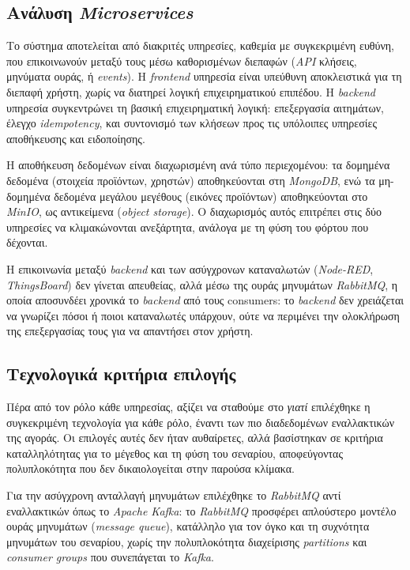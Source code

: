\newpage
\subsection{Ανάλυση \textit{Microservices}}

Το σύστημα αποτελείται από διακριτές υπηρεσίες, καθεμία με συγκεκριμένη ευθύνη, που επικοινωνούν μεταξύ τους μέσω καθορισμένων διεπαφών (\textit{API} κλήσεις, μηνύματα ουράς, ή \textit{events}). Η \textit{frontend} υπηρεσία είναι υπεύθυνη αποκλειστικά για τη διεπαφή χρήστη, χωρίς να διατηρεί λογική επιχειρηματικού επιπέδου. Η \textit{backend} υπηρεσία συγκεντρώνει τη βασική επιχειρηματική λογική: επεξεργασία αιτημάτων, έλεγχο \textit{idempotency}, και συντονισμό των κλήσεων προς τις υπόλοιπες υπηρεσίες αποθήκευσης και ειδοποίησης.

Η αποθήκευση δεδομένων είναι διαχωρισμένη ανά τύπο περιεχομένου: τα δομημένα δεδομένα (στοιχεία προϊόντων, χρηστών) αποθηκεύονται στη \textit{MongoDB}, ενώ τα μη-δομημένα δεδομένα μεγάλου μεγέθους (εικόνες προϊόντων) αποθηκεύονται στο \textit{MinIO}, ως αντικείμενα (\textit{object storage}). Ο διαχωρισμός αυτός επιτρέπει στις δύο υπηρεσίες να κλιμακώνονται ανεξάρτητα, ανάλογα με τη φύση του φόρτου που δέχονται.

Η επικοινωνία μεταξύ \textit{backend} και των ασύγχρονων καταναλωτών (\textit{Node-RED}, \textit{ThingsBoard}) δεν γίνεται απευθείας, αλλά μέσω της ουράς μηνυμάτων \textit{RabbitMQ}, η οποία αποσυνδέει χρονικά το \textit{backend} από τους consumers: το \textit{backend} δεν χρειάζεται να γνωρίζει πόσοι ή ποιοι καταναλωτές υπάρχουν, ούτε να περιμένει την ολοκλήρωση της επεξεργασίας τους για να απαντήσει στον χρήστη.


\subsection{Τεχνολογικά κριτήρια επιλογής}

Πέρα από τον ρόλο κάθε υπηρεσίας, αξίζει να σταθούμε στο \textit{γιατί} επιλέχθηκε η συγκεκριμένη τεχνολογία για κάθε ρόλο, έναντι των πιο διαδεδομένων εναλλακτικών της αγοράς. Οι επιλογές αυτές δεν ήταν αυθαίρετες, αλλά βασίστηκαν σε κριτήρια καταλληλότητας για το μέγεθος και τη φύση του σεναρίου, αποφεύγοντας πολυπλοκότητα που δεν δικαιολογείται στην παρούσα κλίμακα.

Για την ασύγχρονη ανταλλαγή μηνυμάτων επιλέχθηκε το \textit{RabbitMQ} αντί εναλλακτικών όπως το \textit{Apache Kafka}: το \textit{RabbitMQ} προσφέρει απλούστερο μοντέλο ουράς μηνυμάτων (\textit{message queue}), κατάλληλο για τον όγκο και τη συχνότητα μηνυμάτων του σεναρίου, χωρίς την πολυπλοκότητα διαχείρισης \textit{partitions} και \textit{consumer groups} που συνεπάγεται το \textit{Kafka}.

